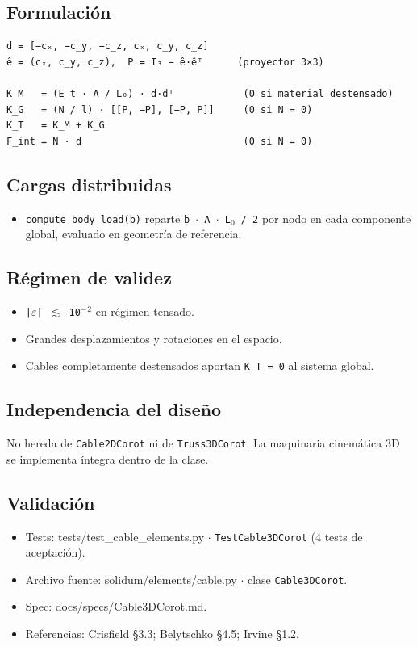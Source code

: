 \documentclass[11pt,letterpaper,oneside]{report}
\begin{document}
\subsection{Formulación}
\begin{lstlisting}
d = [−cₓ, −c_y, −c_z, cₓ, c_y, c_z]
ê = (cₓ, c_y, c_z),  P = I₃ − ê·êᵀ      (proyector 3×3)

K_M   = (E_t · A / L₀) · d·dᵀ            (0 si material destensado)
K_G   = (N / l) · [[P, −P], [−P, P]]     (0 si N = 0)
K_T   = K_M + K_G
F_int = N · d                            (0 si N = 0)

\end{lstlisting}

\subsection{Cargas distribuidas}
\begin{itemize}
  \item \texttt{compute\_body\_load(b)} reparte \texttt{b \ensuremath{\cdot} A \ensuremath{\cdot} L\ensuremath{_{0}} / 2} por nodo en cada componente global, evaluado en geometría de referencia.
\end{itemize}

\subsection{Régimen de validez}
\begin{itemize}
  \item \texttt{|\ensuremath{\varepsilon}| \ensuremath{\lesssim} 10\ensuremath{^{-}}\ensuremath{^{2}}} en régimen tensado.
  \item Grandes desplazamientos y rotaciones en el espacio.
  \item Cables completamente destensados aportan \texttt{K\_T = 0} al sistema global.
\end{itemize}

\subsection{Independencia del diseño}
No hereda de \texttt{Cable2DCorot} ni de \texttt{Truss3DCorot}. La maquinaria cinemática 3D se implementa íntegra dentro de la clase.

\subsection{Validación}
\begin{itemize}
  \item Tests: tests/test\_cable\_elements.py \ensuremath{\cdot} \texttt{TestCable3DCorot} (4 tests de aceptación).
  \item Archivo fuente: solidum/elements/cable.py \ensuremath{\cdot} clase \texttt{Cable3DCorot}.
  \item Spec: docs/specs/Cable3DCorot.md.
  \item Referencias: Crisfield §3.3; Belytschko §4.5; Irvine §1.2.
\end{itemize}
\end{document}
